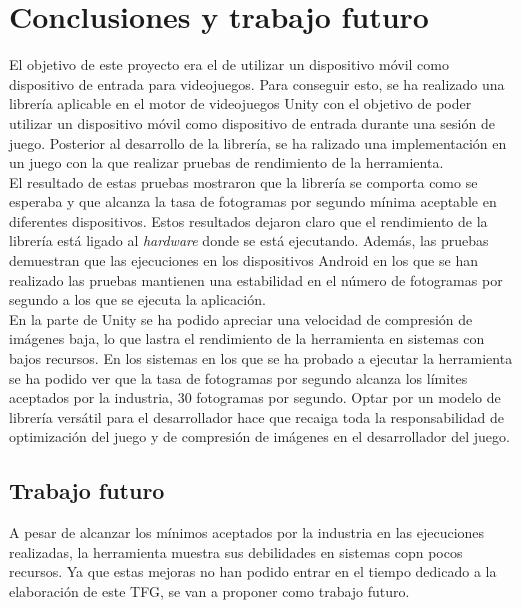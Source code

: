 
\chapter{Conclusiones y trabajo futuro}
\label{cap7}
\label{cap:conclusiones}


El objetivo de este proyecto era el de utilizar un dispositivo m\'ovil como dispositivo de entrada para videojuegos. Para conseguir esto, se ha realizado una librer\'ia aplicable en el motor de videojuegos Unity con el objetivo de poder utilizar un dispositivo m\'ovil como dispositivo de entrada durante una sesi\'on de juego. Posterior al desarrollo de la librer\'ia, se ha ralizado una implementaci\'on en un juego con la que realizar pruebas de rendimiento de la herramienta.\\

El resultado de estas pruebas mostraron que la librer\'ia se comporta como se esperaba y que alcanza la tasa de fotogramas por segundo m\'inima aceptable en diferentes dispositivos. Estos resultados dejaron claro que el rendimiento de la librer\'ia est\'a ligado al \textit{hardware} donde se est\'a ejecutando. Adem\'as, las pruebas demuestran que las ejecuciones en los dispositivos Android en los que se han realizado las pruebas mantienen una estabilidad en el n\'umero de fotogramas por segundo a los que se ejecuta la aplicaci\'on.\\

En la parte de Unity se ha podido apreciar una velocidad de compresi\'on de im\'agenes baja, lo que lastra el rendimiento de la herramienta en sistemas con bajos recursos. En los sistemas en los que se ha probado a ejecutar la herramienta se ha podido ver que la tasa de fotogramas por segundo alcanza los l\'imites aceptados por la industria, 30 fotogramas por segundo. Optar por un modelo de librer\'ia vers\'atil para el desarrollador hace que recaiga toda la responsabilidad de optimizaci\'on del juego y de compresi\'on de im\'agenes en el desarrollador del juego.\\

\section{Trabajo futuro}

A pesar de alcanzar los m\'inimos aceptados por la industria en las ejecuciones realizadas, la herramienta muestra sus debilidades en sistemas copn pocos recursos. Ya que estas mejoras no han podido entrar en el tiempo dedicado a la elaboraci\'on de este TFG, se van a proponer como trabajo futuro.\\

